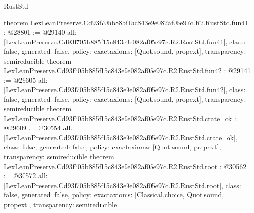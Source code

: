 \begin{lexlean}{RustStd}
\begin{coremodule}
{}
theorem LexLeanPreserve.Cd93f705b885f15c843e9e082af05e97c.R2.RustStd.fun41 : @28801 := @29140 {
  all: [LexLeanPreserve.Cd93f705b885f15c843e9e082af05e97c.R2.RustStd.fun41],
  class: false,
  generated: false,
  policy: exact{axioms: [Quot.sound, propext]},
  transparency: semireducible
}
theorem LexLeanPreserve.Cd93f705b885f15c843e9e082af05e97c.R2.RustStd.fun42 : @29141 := @29605 {
  all: [LexLeanPreserve.Cd93f705b885f15c843e9e082af05e97c.R2.RustStd.fun42],
  class: false,
  generated: false,
  policy: exact{axioms: [Quot.sound, propext]},
  transparency: semireducible
}
theorem LexLeanPreserve.Cd93f705b885f15c843e9e082af05e97c.R2.RustStd.crate_ok : @29609 := @30554 {
  all: [LexLeanPreserve.Cd93f705b885f15c843e9e082af05e97c.R2.RustStd.crate_ok],
  class: false,
  generated: false,
  policy: exact{axioms: [Quot.sound, propext]},
  transparency: semireducible
}
theorem LexLeanPreserve.Cd93f705b885f15c843e9e082af05e97c.R2.RustStd.root : @30562 := @30572 {
  all: [LexLeanPreserve.Cd93f705b885f15c843e9e082af05e97c.R2.RustStd.root],
  class: false,
  generated: false,
  policy: exact{axioms: [Classical.choice, Quot.sound, propext]},
  transparency: semireducible
}


\end{coremodule}
\end{lexlean}
